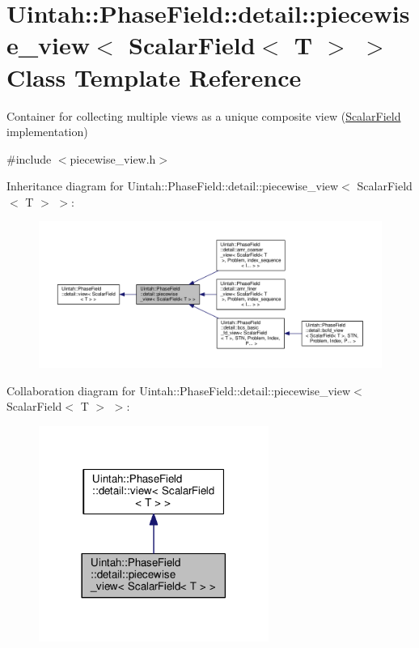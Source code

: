\hypertarget{classUintah_1_1PhaseField_1_1detail_1_1piecewise__view_3_01ScalarField_3_01T_01_4_01_4}{}\section{Uintah\+:\+:Phase\+Field\+:\+:detail\+:\+:piecewise\+\_\+view$<$ Scalar\+Field$<$ T $>$ $>$ Class Template Reference}
\label{classUintah_1_1PhaseField_1_1detail_1_1piecewise__view_3_01ScalarField_3_01T_01_4_01_4}


Container for collecting multiple views as a unique composite view (\hyperlink{structUintah_1_1PhaseField_1_1ScalarField}{Scalar\+Field} implementation)  




{\ttfamily \#include $<$piecewise\+\_\+view.\+h$>$}



Inheritance diagram for Uintah\+:\+:Phase\+Field\+:\+:detail\+:\+:piecewise\+\_\+view$<$ Scalar\+Field$<$ T $>$ $>$\+:\nopagebreak
\begin{figure}[H]
\begin{center}
\leavevmode
\includegraphics[width=350pt]{classUintah_1_1PhaseField_1_1detail_1_1piecewise__view_3_01ScalarField_3_01T_01_4_01_4__inherit__graph}
\end{center}
\end{figure}


Collaboration diagram for Uintah\+:\+:Phase\+Field\+:\+:detail\+:\+:piecewise\+\_\+view$<$ Scalar\+Field$<$ T $>$ $>$\+:\nopagebreak
\begin{figure}[H]
\begin{center}
\leavevmode
\includegraphics[width=213pt]{classUintah_1_1PhaseField_1_1detail_1_1piecewise__view_3_01ScalarField_3_01T_01_4_01_4__coll__graph}
\end{center}
\end{figure}
